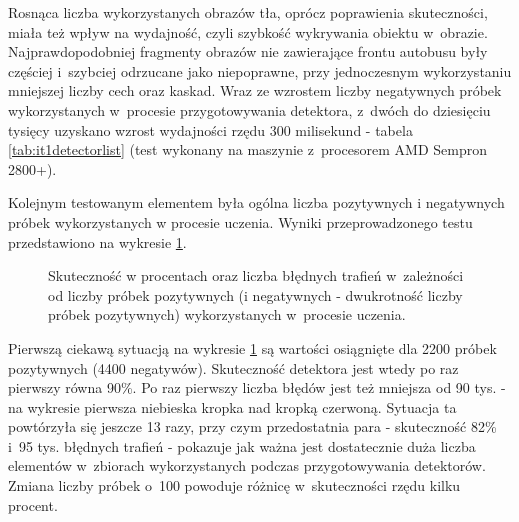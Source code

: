 Rosnąca liczba wykorzystanych obrazów tła, oprócz poprawienia skuteczności, miała
też wpływ na wydajność, czyli szybkość wykrywania obiektu w~obrazie. Najprawdopodobniej
fragmenty obrazów nie zawierające frontu autobusu były częściej i~szybciej odrzucane jako
niepoprawne, przy jednoczesnym wykorzystaniu mniejszej liczby cech oraz kaskad.
Wraz ze wzrostem liczby negatywnych próbek wykorzystanych w~procesie przygotowywania
detektora, z~dwóch do dziesięciu tysięcy uzyskano wzrost wydajności rzędu 300 milisekund - 
tabela \ref{tab:it1detectorlist} (test wykonany na maszynie z~procesorem AMD Sempron 2800+).

Kolejnym testowanym elementem była ogólna liczba pozytywnych i negatywnych próbek
wykorzystanych w procesie uczenia. Wyniki przeprowadzonego testu przedstawiono 
na wykresie \ref{chart:500to11200pos_2x_neg}.

\begin{figure}[h!]
	\begin{center}
	\end{center}
	\caption{Skuteczność w procentach oraz liczba błędnych trafień
		w~zależności od liczby próbek pozytywnych (i negatywnych - dwukrotność 
		liczby próbek pozytywnych) wykorzystanych 
		w~procesie uczenia.}
	\label{chart:500to11200pos_2x_neg}
\end{figure}

Pierwszą ciekawą sytuacją na wykresie \ref{chart:500to11200pos_2x_neg} są wartości
osiągnięte dla 2200 próbek pozytywnych (4400 negatywów). Skuteczność detektora
jest wtedy po raz pierwszy równa 90\%. Po raz pierwszy liczba błędów jest też mniejsza
od 90 tys. - na wykresie pierwsza niebieska kropka nad kropką czerwoną. 
Sytuacja ta powtórzyła się
jeszcze 13 razy, przy czym przedostatnia para - skuteczność 82\% i~95 tys. błędnych trafień - 
pokazuje jak ważna jest dostatecznie duża liczba elementów w~zbiorach
wykorzystanych podczas przygotowywania detektorów. Zmiana liczby próbek o~100
powoduje różnicę w~skuteczności rzędu kilku procent.

